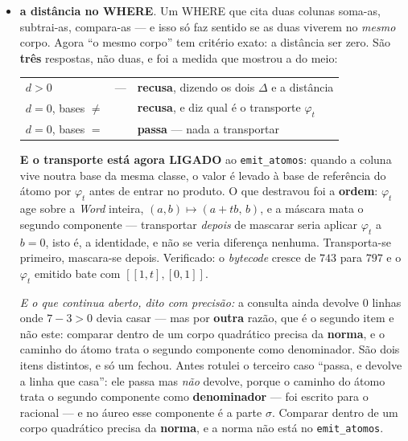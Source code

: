 \documentclass[11pt]{article}
\newcommand{\code}[1]{\texttt{\small #1}}
\theoremstyle{plain}
\theoremstyle{remark}
\begin{document}
\begin{itemize}
Duas coisas que valem mais que a tabela. Primeira: o \textbf{racional sai marcado com um traço}.
Ele não é da família quadrática binária, não tem régua desta forma, e \emph{inventar} um
$\Delta$ para ele seria pior que não responder. Segunda, e é o ponto: quando a distância é
\textbf{zero} --- \code{AUREO(1)} e \code{AUREO(-1)}, ambos com $\Delta=5$ --- a query não se
limita a dizer ``isomorfos'': ela diz \textbf{como ir}, com $t = (B_2-B_1)/2 = -1$, e a palavra
que o executa. Conferido no metal: $(5,3) \mapsto (2,3)$ por \code{NEGRO} \code{TROCA}, que é
$\varphi_{-1}$.

\emph{A query descobre que duas colunas são o mesmo corpo e responde em opcodes, não em fórmula.}
E quem faz o transporte é o parabólico --- a peça que não precisava de opcode por ser palavra de
duas.
\item \textbf{a distância no WHERE}. Um WHERE que cita duas colunas soma-as, subtrai-as,
compara-as --- e isso só faz sentido se as duas viverem no \emph{mesmo} corpo. Agora ``o mesmo
corpo'' tem critério exato: a distância ser zero. São \textbf{três} respostas, não duas, e foi a
medida que mostrou a do meio:

\begin{center}\begin{tabular}{lll}
$d > 0$ & --- & \textbf{recusa}, dizendo os dois $\Delta$ e a distância \\
$d = 0$, bases $\neq$ & & \textbf{recusa}, e diz qual é o transporte $\varphi_t$ \\
$d = 0$, bases $=$ & & \textbf{passa} --- nada a transportar \\
\end{tabular}\end{center}

\textbf{E o transporte está agora LIGADO} ao \code{emit\_atomos}: quando a coluna vive noutra
base da mesma classe, o valor é levado à base de referência do átomo por $\varphi_t$ antes de
entrar no produto. O que destravou foi a \textbf{ordem}: $\varphi_t$ age sobre a \emph{Word}
inteira, $(a,b) \mapsto (a+tb,\,b)$, e a máscara mata o segundo componente --- transportar
\emph{depois} de mascarar seria aplicar $\varphi_t$ a $b=0$, isto é, a identidade, e não se veria
diferença nenhuma. Transporta-se primeiro, mascara-se depois. Verificado: o \emph{bytecode} cresce
de $743$ para $797$ e o $\varphi_t$ emitido bate com $[[1,t],[0,1]]$.

\emph{E o que continua aberto, dito com precisão:} a consulta ainda devolve $0$ linhas onde
$7-3>0$ devia casar --- mas por \textbf{outra} razão, que é o segundo item e não este: comparar
dentro de um corpo quadrático precisa da \textbf{norma}, e o caminho do átomo trata o segundo
componente como denominador. São dois itens distintos, e só um fechou. Antes rotulei o terceiro caso ``passa, e devolve a linha que
casa'': ele passa mas \emph{não} devolve, porque o caminho do átomo trata o segundo componente
como \textbf{denominador} --- foi escrito para o racional --- e no áureo esse componente é a parte
$\sigma$. Comparar dentro de um corpo quadrático precisa da \textbf{norma}, e a norma não está
no \code{emit\_atomos}.


\end{itemize}
\end{document}
